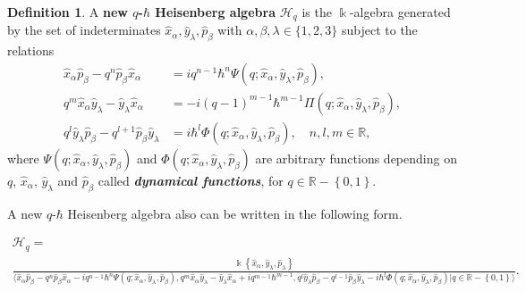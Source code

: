 \documentclass[12pt,a4paper]{article}
\theoremstyle{plain}
\newtheorem{proposition}[theorem]{Proposition}
\theoremstyle{definition}
\newtheorem{definition}[theorem]{Definition}
\theoremstyle{remark}
\begin{document}
\begin{definition}\label{NPh}
A \textbf{new $q$-$\hbar$ Heisenberg algebra} $\boldsymbol{\mathcal{H}}_{q}$ is the $\Bbbk$-algebra generated by the set of indeterminates $\hat{x}_{\alpha}, \hat{y}_{\lambda}, \hat{p}_{\beta}$ with $\alpha, \beta, \lambda \in \{1, 2, 3\}$ subject to the relations
\begin{align}
    \label{nH1}
    \hat{x}_{\alpha}\hat{p}_{\beta} - q^{n}\hat{p}_{\beta}\hat{x}_{\alpha} &= iq^{n-1}\hbar^{n}\Psi(q; \hat{x}_{\alpha}, \hat{y}_{\lambda},\hat{p}_{\beta}), \\
    \label{nH2}q^{m}\hat{x}_{\alpha}\hat{y}_{\lambda} - \hat{y}_{\lambda}\hat{x}_{\alpha} &= -i(q-1)^{m-1}\hbar^{m-1}\Pi (q;\hat{x}_{\alpha},\hat{y}_{\lambda},\hat{p}_{\beta}), \\
    \label{nH3}q^{l}\hat{y}_{\lambda}\hat{p}_{\beta} - q^{l+1}\hat{p}_{\beta}\hat{y}_{\lambda} &= i\hbar^{l}\Phi (q; \hat{x}_{\alpha},\hat{y}_{\lambda}, \hat{p}_{\beta}), \quad n, l, m \in \mathbb{R},
\end{align}
where $\Psi (q; \hat{x}_{\alpha}, \hat{y}_{\lambda}, \hat{p}_{\beta})$ and $\Phi (q; \hat{x}_{\alpha},\hat{y}_{\lambda}, \hat{p}_{\beta})$ are arbitrary functions depending on $q$, $\hat{x}_{\alpha}$, $\hat{y}_{\lambda}$ and $\hat{p}_{\beta}$ called \textit{\textbf{dynamical functions}}, for $q \in\mathbb{R}-\left\lbrace 0,1\right\rbrace$.
\end{definition}
A new $q$-$\hbar$ Heisenberg algebra also can be written in the following form.
    \begin{tiny}
    \begin{multline*}
      \boldsymbol{\mathcal{H}}_{q}
      =\\\frac{\Bbbk  \left\lbrace\hat{x}_{\alpha},\hat{y}_{\lambda}, \hat{p}_{\lambda}\right\rbrace}{\langle\hat{x}_{\alpha}\hat{p}_{\beta}-q^{n}\hat{p}_{\beta}\hat{x}_{\alpha}-  iq^{n-1}\hbar^{n}\Psi (q;\hat{x}_{\alpha},\hat{y}_{\lambda},\hat{p}_{\beta}),q^{m}\hat{x}_{\alpha}\hat{y}_{\lambda}-\hat{y}_{\lambda}\hat{x}_{\alpha}+iq^{m-1}\hbar^{m-1}, q^{l}\hat{y}_{\lambda}\hat{p}_{\beta}-q^{l-1}\hat{p}_{\beta}\hat{y}_{\lambda}-i\hbar^{l}\Phi (q;\hat{x}_{\alpha},\hat{y}_{\lambda},\hat{p}_{\beta})\vert q\in\mathbb{R}-\left\lbrace 0, 1\right\rbrace\rangle}. 
    \end{multline*}
    \end{tiny}
\end{document}

